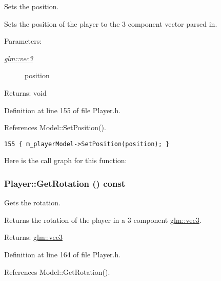 Sets the position. 

Sets the position of the player to the 3 component vector parsed in.

\begin{Desc}
\item[Parameters:]
\begin{description}
\item[{\em \hyperlink{group__core__types_g1c47e8b3386109bc992b6c48e91b0be7}{glm::vec3}}]position \end{description}
\end{Desc}
\begin{Desc}
\item[Returns:]void \end{Desc}


Definition at line 155 of file Player.h.

References Model::SetPosition().

\begin{Code}\begin{verbatim}155 { m_playerModel->SetPosition(position); }
\end{verbatim}
\end{Code}




Here is the call graph for this function:\hypertarget{class_player_df9696bac0f5ef8d18b7faff9b75e21e}{
\subsubsection[GetRotation]{ Player::GetRotation () const}}
\label{class_player_df9696bac0f5ef8d18b7faff9b75e21e}


Gets the rotation. 

Returns the rotation of the player in a 3 component \hyperlink{group__core__types_g1c47e8b3386109bc992b6c48e91b0be7}{glm::vec3}.

\begin{Desc}
\item[Returns:]\hyperlink{group__core__types_g1c47e8b3386109bc992b6c48e91b0be7}{glm::vec3} \end{Desc}


Definition at line 164 of file Player.h.

References Model::GetRotation().

